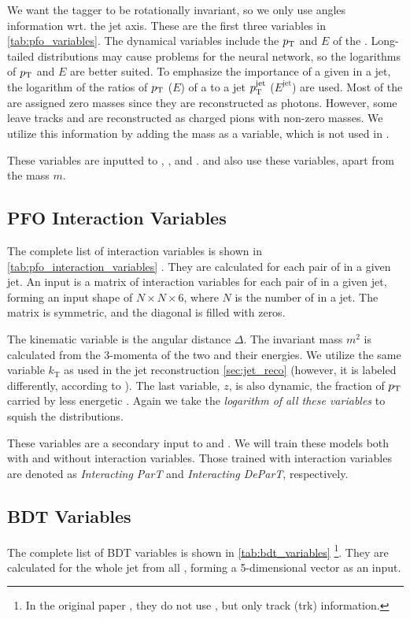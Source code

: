 We want the tagger to be rotationally invariant, so we only use angles information wrt. the jet axis.
These are the first three variables in \cref{tab:pfo_variables}.
The dynamical variables include the $p_\text{T}$ and $E$ of the \PFO.
Long-tailed distributions may cause problems for the neural network, so the logarithms of $p_\text{T}$ and $E$ are better suited. 
To emphasize the importance of a given \PFO in a jet, the logarithm of the ratios of $p_\text{T}$ ($E$) of a \PFO to a jet $p_\text{T}^\mathrm{jet}$ ($E^\mathrm{jet}$) are used.
Most of the \PFOs are assigned zero masses since they are reconstructed as photons.
However, some leave tracks and are reconstructed as charged pions with non-zero masses.
We utilize this information by adding the mass as a variable, which is not used in \cite{part}.

These variables are inputted to \trans, \ParT, and \depart.
\PFN and \EFN also use these variables, apart from the mass $m$.

\subsection{PFO Interaction Variables}
\label{sec:pfo_interaction_variables}

The complete list of \PFO interaction variables is shown in \cref{tab:pfo_interaction_variables} \cite{part}.
They are calculated for each pair of \PFOs in a given jet.
An input is a matrix of \PFO interaction variables for each pair of \PFOs in a given jet, forming an input shape of $N \times N \times 6$, where $N$ is the number of \PFOs in a jet.
The matrix is symmetric, and the diagonal is filled with zeros.

The kinematic variable is the angular distance $\Delta$.
The invariant mass $m^2$ is calculated from the 3-momenta of the two \PFOs and their energies.
We utilize the same variable $k_\mathrm{T}$ as used in the jet reconstruction \cref{sec:jet_reco} (however, it is labeled differently, according to \cite{part}).
The last variable, $z$, is also dynamic, the fraction of $p_\text{T}$ carried by less energetic \PFO.
Again we take the \emph{logarithm of all these variables} to squish the distributions. 

These variables are a secondary input to \ParT and \depart.
We will train these models both with and without interaction variables.
Those trained with interaction variables are denoted as \emph{Interacting ParT} and \emph{Interacting DeParT}, respectively.

\subsection{BDT Variables}
\label{sec:bdt_variables}

The complete list of BDT variables is shown in \cref{tab:bdt_variables} \cite{bdt_tag} \footnote{In the original paper \cite{bdt_tag}, they do not use \PFOs, but only track (trk) information.}.
They are calculated for the whole jet from all \PFOs, forming a 5-dimensional vector as an input.

